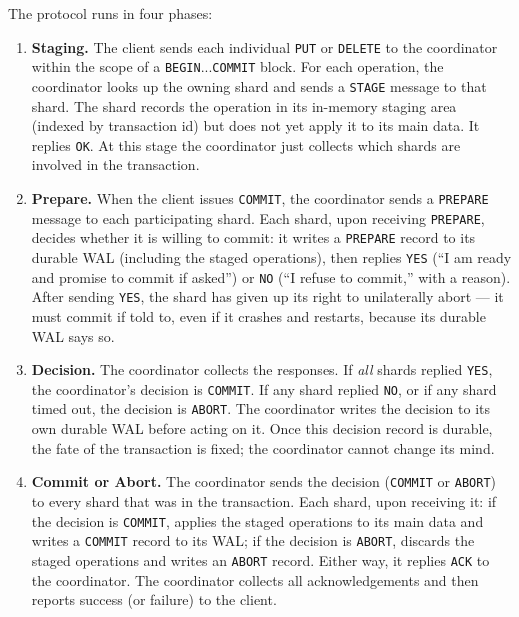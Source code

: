 \documentclass[11pt,a4paper]{article}
\begin{document}
The protocol runs in four phases:

\begin{enumerate}
\item \textbf{Staging.} The client sends each individual \texttt{PUT} or \texttt{DELETE} to the coordinator within the scope of a \texttt{BEGIN}...\texttt{COMMIT} block. For each operation, the coordinator looks up the owning shard and sends a \texttt{STAGE} message to that shard. The shard records the operation in its in-memory staging area (indexed by transaction id) but does not yet apply it to its main data. It replies \texttt{OK}. At this stage the coordinator just collects which shards are involved in the transaction.

\item \textbf{Prepare.} When the client issues \texttt{COMMIT}, the coordinator sends a \texttt{PREPARE} message to each participating shard. Each shard, upon receiving \texttt{PREPARE}, decides whether it is willing to commit: it writes a \texttt{PREPARE} record to its durable WAL (including the staged operations), then replies \texttt{YES} (``I am ready and promise to commit if asked'') or \texttt{NO} (``I refuse to commit,'' with a reason). After sending \texttt{YES}, the shard has given up its right to unilaterally abort --- it must commit if told to, even if it crashes and restarts, because its durable WAL says so.

\item \textbf{Decision.} The coordinator collects the responses. If \textit{all} shards replied \texttt{YES}, the coordinator's decision is \texttt{COMMIT}. If any shard replied \texttt{NO}, or if any shard timed out, the decision is \texttt{ABORT}. The coordinator writes the decision to its own durable WAL before acting on it. Once this decision record is durable, the fate of the transaction is fixed; the coordinator cannot change its mind.

\item \textbf{Commit or Abort.} The coordinator sends the decision (\texttt{COMMIT} or \texttt{ABORT}) to every shard that was in the transaction. Each shard, upon receiving it: if the decision is \texttt{COMMIT}, applies the staged operations to its main data and writes a \texttt{COMMIT} record to its WAL; if the decision is \texttt{ABORT}, discards the staged operations and writes an \texttt{ABORT} record. Either way, it replies \texttt{ACK} to the coordinator. The coordinator collects all acknowledgements and then reports success (or failure) to the client.
\end{enumerate}
\end{document}
